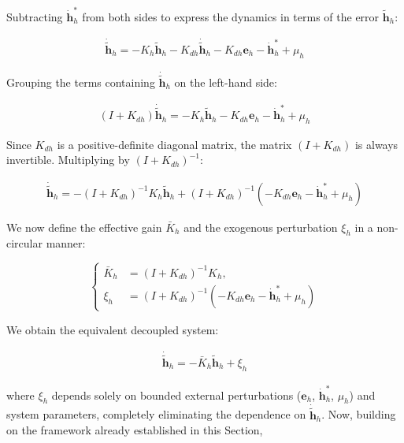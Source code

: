 \documentclass[sn-mathphys-num]{sn-jnl}
\theoremstyle{thmstyleone}%
\theoremstyle{thmstyletwo}%
\theoremstyle{thmstylethree}%
\begin{document}
Subtracting $\dot{\mathbf{h}}_h^*$ from both sides to express the dynamics in terms of the error $\tilde{\mathbf{h}}_h$:

\begin{align}
\dot{\tilde{\mathbf{h}}}_h = -K_h \tilde{\mathbf{h}}_h - K_{dh} \dot{\tilde{\mathbf{h}}}_h - K_{dh} \mathbf{e}_h - \dot{\mathbf{h}}_h^* + \mu_h
\end{align}

Grouping the terms containing $\dot{\tilde{\mathbf{h}}}_h$ on the left-hand side:

\begin{align}
(I + K_{dh}) \dot{\tilde{\mathbf{h}}}_h = -K_h \tilde{\mathbf{h}}_h - K_{dh} \mathbf{e}_h - \dot{\mathbf{h}}_h^* + \mu_h
\end{align}
 
Since $K_{dh}$ is a positive-definite diagonal matrix, the matrix $(I + K_{dh})$ is always invertible. Multiplying by $(I + K_{dh})^{-1}$:

\begin{align}
\dot{\tilde{\mathbf{h}}}_h = -(I + K_{dh})^{-1} K_h \tilde{\mathbf{h}}_h + (I + K_{dh})^{-1} (-K_{dh} \mathbf{e}_h - \dot{\mathbf{h}}_h^* + \mu_h)
\end{align}

We now define the effective gain $\bar{K}_h$ and the exogenous perturbation $\xi_h$ in a non-circular manner:

\begin{equation}\label{eq:ganancia.perturbacion}
\left\{
\begin{aligned} 
\bar{K}_h &= (I + K_{dh})^{-1} K_h,\\
\xi_h &= (I + K_{dh})^{-1} (-K_{dh} \mathbf{e}_h - \dot{\mathbf{h}}_h^* + \mu_h)
\end{aligned}
\right.
\end{equation}

We obtain the equivalent decoupled system:

\begin{align}\label{eq:nuevo_Kh}
\dot{\tilde{\mathbf{h}}}_h = -\bar{K}_h \tilde{\mathbf{h}}_h + \xi_h
\end{align}

where $\xi_h$ depends solely on bounded external perturbations ($\mathbf{e}_h$, $\dot{\mathbf{h}}_h^*$, $\mu_h$) and system parameters, completely eliminating the dependence on $\dot{\tilde{\mathbf{h}}}_h$.
Now, building on the framework already established in this Section,
\end{document}

